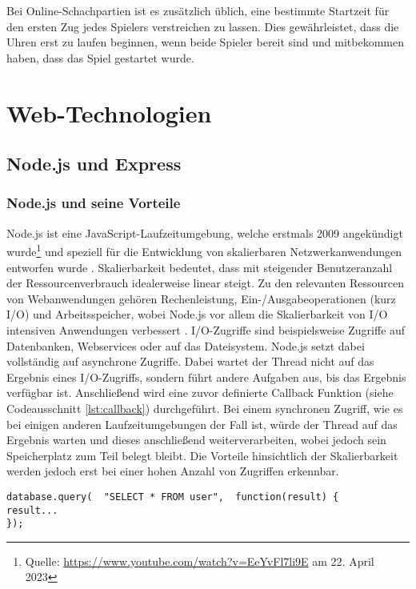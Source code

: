 Bei Online-Schachpartien ist es zusätzlich üblich, eine bestimmte Startzeit für den ersten Zug jedes Spielers verstreichen zu lassen. Dies gewährleistet, dass die Uhren erst zu laufen beginnen, wenn beide Spieler bereit sind und mitbekommen haben, dass das Spiel gestartet wurde.

    \section{Web-Technologien}
        \subsection{Node.js und Express}
        \subsubsection{Node.js und seine Vorteile}
        \label{sec:node.js}
Node.js ist eine JavaScript-Laufzeitumgebung, welche erstmals 2009 angekündigt wurde\footnote{Quelle: \url{https://www.youtube.com/watch?v=EeYvFl7li9E} am 22. April 2023} und speziell für die Entwicklung von skalierbaren Netzwerkanwendungen entworfen wurde \cite{nodejs}. Skalierbarkeit bedeutet, dass mit steigender Benutzeranzahl der Ressourcenverbrauch idealerweise linear steigt. Zu den relevanten Ressourcen von Webanwendungen gehören Rechenleistung, Ein-/Ausgabeoperationen (kurz I/O) und Arbeitsspeicher, wobei Node.js vor allem die Skalierbarkeit von I/O intensiven Anwendungen verbessert \cite{nodejsbook}.
I/O-Zugriffe sind beispielsweise Zugriffe auf Datenbanken, Webservices oder auf das Dateisystem. Node.js setzt dabei vollständig auf asynchrone Zugriffe. Dabei wartet der Thread nicht auf das Ergebnis eines I/O-Zugriffs, sondern führt andere Aufgaben aus, bis das Ergebnis verfügbar ist. Anschließend wird eine zuvor definierte Callback Funktion (siehe Codeausschnitt \ref{lst:callback}) durchgeführt. Bei einem synchronen Zugriff, wie es bei einigen anderen Laufzeitumgebungen der Fall ist, würde der Thread auf das Ergebnis warten und dieses anschließend weiterverarbeiten, wobei jedoch sein Speicherplatz zum Teil belegt bleibt.\cite{nodejsbook} Die Vorteile hinsichtlich der Skalierbarkeit werden jedoch erst bei einer hohen Anzahl von Zugriffen erkennbar.

\begin{lstlisting}[style=codeStyle, caption={Beispiel einer Callback Funktion \textbf{Quelle: } \cite{nodejsbook}}, label={lst:callback}]
database.query(  "SELECT * FROM user",  function(result) {
result...
});
\end{lstlisting}


